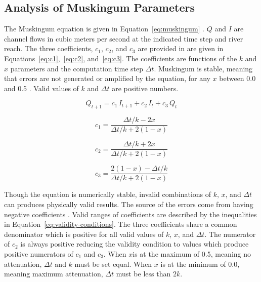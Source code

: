 \subsection{Analysis of Muskingum Parameters}
\label{subsec:analysis-muskingum-parameters}

The Muskingum equation is given in Equation~\ref{eq:muskingum} \citep{usace_hms}.
$Q$ and $I$ are channel flows in cubic meters per second at the indicated time step and river reach.
The three coefficients, $c_1$, $c_2$, and $c_3$ are provided in are given in Equations~\ref{eq:c1},~\ref{eq:c2}, and~\ref{eq:c3}.
The coefficients are functions of the $k$ and $x$ parameters and the computation time step $\Delta t$.
Muskingum is stable, meaning that errors are not generated or amplified by the equation, for any $x$ between 0.0 and 0.5 \citep{mccarthy1938}.
Valid values of $k$ and $\Delta t$ are positive numbers.

\begin{equation}
  Q_{t+1} = c_1\, I_{t+1} + c_2\, I_t + c_3\, Q_t
  \label{eq:muskingum}
\end{equation}

\begin{equation}
  c_1 = \frac{\Delta t / k - 2x}{\Delta t / k + 2 (1-x)}
  \label{eq:c1}
\end{equation}

\begin{equation}
  c_2 = \frac{\Delta t / k + 2x}{\Delta t / k + 2 (1-x)}
  \label{eq:c2}
\end{equation}

\begin{equation}
  c_3 = \frac{2 (1-x) - \Delta t / k}{\Delta t / k + 2 (1-x)}
  \label{eq:c3}
\end{equation}

Though the equation is numerically stable, invalid combinations of $k$, $x$, and $\Delta t$ can produces physically valid results.
The source of the errors come from having negative coefficients \citep{hjelmfelt1985, chow1988, gill1992}.
Valid ranges of coefficients are described by the inequalities in Equation~\ref{eq:validity-conditions}.
The three coefficients share a common denominator which is positive for all valid values of $k$, $x$, and $\Delta t$.
The numerator of $c_2$ is always positive reducing the validity condition to values which produce positive numerators of $c_1$ and $c_3$.
When $x$is at the maximum of 0.5, meaning no attenuation, $\Delta t$ and $k$ must be set equal.
When $x$ is at the minimum of 0.0, meaning maximum attenuation, $\Delta t$ must be less than $2k$.

